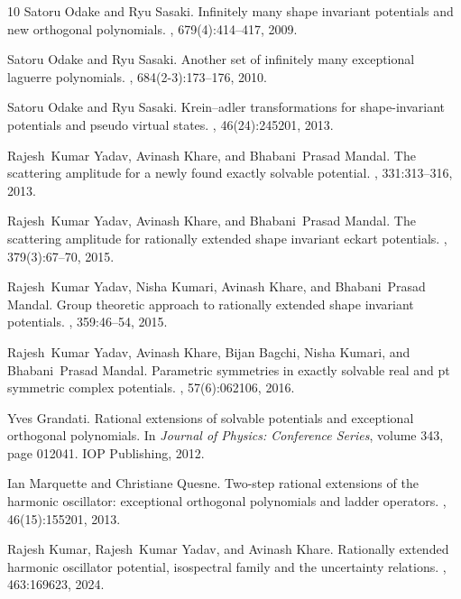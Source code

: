 \documentclass[12pt]{article}
\numberwithin{equation}{section} %
\begin{document}
\begin{thebibliography}{10}
Satoru Odake and Ryu Sasaki.
\newblock Infinitely many shape invariant potentials and new orthogonal
  polynomials.
, 679(4):414--417, 2009.

Satoru Odake and Ryu Sasaki.
\newblock Another set of infinitely many exceptional laguerre polynomials.
, 684(2-3):173--176, 2010.

Satoru Odake and Ryu Sasaki.
\newblock Krein--adler transformations for shape-invariant potentials and
  pseudo virtual states.
,
  46(24):245201, 2013.

Rajesh~Kumar Yadav, Avinash Khare, and Bhabani~Prasad Mandal.
\newblock The scattering amplitude for a newly found exactly solvable
  potential.
, 331:313--316, 2013.

Rajesh~Kumar Yadav, Avinash Khare, and Bhabani~Prasad Mandal.
\newblock The scattering amplitude for rationally extended shape invariant
  eckart potentials.
, 379(3):67--70, 2015.

Rajesh~Kumar Yadav, Nisha Kumari, Avinash Khare, and Bhabani~Prasad Mandal.
\newblock Group theoretic approach to rationally extended shape invariant
  potentials.
, 359:46--54, 2015.

Rajesh~Kumar Yadav, Avinash Khare, Bijan Bagchi, Nisha Kumari, and
  Bhabani~Prasad Mandal.
\newblock Parametric symmetries in exactly solvable real and pt symmetric
  complex potentials.
, 57(6):062106, 2016.

Yves Grandati.
\newblock Rational extensions of solvable potentials and exceptional orthogonal
  polynomials.
\newblock In {\em Journal of Physics: Conference Series}, volume 343, page
  012041. IOP Publishing, 2012.

Ian Marquette and Christiane Quesne.
\newblock Two-step rational extensions of the harmonic oscillator: exceptional
  orthogonal polynomials and ladder operators.
,
  46(15):155201, 2013.

Rajesh Kumar, Rajesh~Kumar Yadav, and Avinash Khare.
\newblock Rationally extended harmonic oscillator potential, isospectral family
  and the uncertainty relations.
, 463:169623, 2024.


\end{thebibliography}
\end{document}
